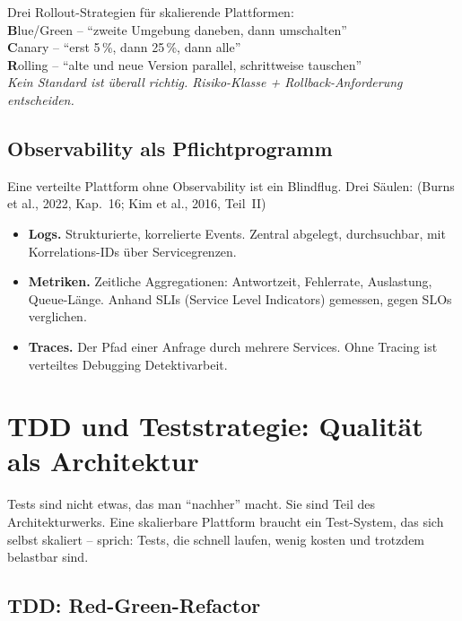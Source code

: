 \documentclass[11pt,a4paper,oneside]{article}
\newcommand{\caveatfontfallback}{\itshape}
\newcommand\caveatfont{\caveatfontfallback}%
\newcommand{\akzent}[1]{{\caveatfont\color{lpAmber}#1}}
\newcommand{\fachbegriff}[1]{\textbf{#1}}
\newcommand{\quelle}[1]{{\footnotesize\color{lpGray}(#1)}}
\begin{document}
\begin{eselsbox}[Eselsbrücke: \akzent{B-C-R}]
Drei Rollout-Strategien für skalierende Plattformen:\\[2pt]
\textbf{B}lue/Green -- ``zweite Umgebung daneben, dann umschalten''\\
\textbf{C}anary -- ``erst 5\,\%, dann 25\,\%, dann alle''\\
\textbf{R}olling -- ``alte und neue Version parallel, schrittweise tauschen''\\[2pt]
\emph{Kein Standard ist überall richtig. Risiko-Klasse + Rollback-Anforderung entscheiden.}
\end{eselsbox}

\subsection{Observability als Pflichtprogramm}

Eine verteilte Plattform ohne Observability ist ein Blindflug. Drei Säulen: \quelle{Burns et al., 2022, Kap.~16; Kim et al., 2016, Teil~II}

\begin{itemize}
  \item \fachbegriff{Logs.} Strukturierte, korrelierte Events. Zentral abgelegt, durchsuchbar, mit Korrelations-IDs über Servicegrenzen.
  \item \fachbegriff{Metriken.} Zeitliche Aggregationen: Antwortzeit, Fehlerrate, Auslastung, Queue-Länge. Anhand SLIs (Service Level Indicators) gemessen, gegen SLOs verglichen.
  \item \fachbegriff{Traces.} Der Pfad einer Anfrage durch mehrere Services. Ohne Tracing ist verteiltes Debugging Detektivarbeit.
\end{itemize}

\section{TDD und Teststrategie: Qualität als Architektur}

Tests sind nicht etwas, das man ``nachher'' macht. Sie sind Teil des Architekturwerks. Eine skalierbare Plattform braucht ein Test-System, das sich selbst skaliert -- sprich: Tests, die schnell laufen, wenig kosten und trotzdem belastbar sind.

\subsection{TDD: Red-Green-Refactor}
\end{document}
